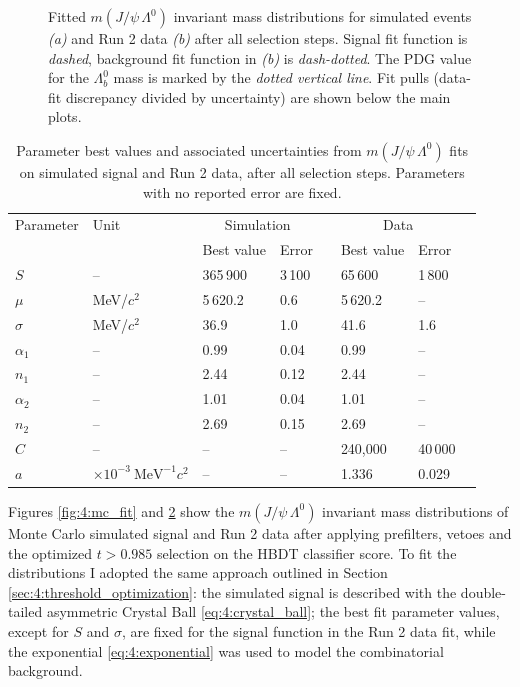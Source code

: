 \begin{figure}[t]
\begin{subfigure}{.45\textwidth}
		\caption{}
		\label{fig:4:data_fit}
	\end{subfigure}
	\caption{Fitted $m(J/\psi\,\Lambda^0)$ invariant mass distributions for simulated \demonstratorshort events \textit{(a)} and Run 2 data \textit{(b)} after all selection steps. Signal fit function is \textit{dashed}, background fit function in \textit{(b)} is \textit{dash-dotted}. The PDG value for the $\Lambda_b^0$ mass \cite{PDG} is marked by the \textit{dotted vertical line}. Fit pulls (data-fit discrepancy divided by uncertainty) are shown below the main plots.}
\end{figure}

\begin{table}
	\begin{center}
	\begin{tabular}{@{}llllllll@{}}
		\toprule
		Parameter
		& Unit
		& \multicolumn{2}{c}{Simulation}	& \phantom{a}
		& \multicolumn{2}{c}{Data} \\
		\cmidrule{3-4} \cmidrule{6-7}
		&& Best value	& Error				&& Best value	& Error \\
		\midrule
		$S$			& --		& 365\,900	& 3\,100&& 65\,600	& 1\,800	\\
		$\mu$		& MeV/$c^2$	& 5\,620.2 	& 0.6	&& 5\,620.2	& -- 		\\
		$\sigma$	& MeV/$c^2$	& 36.9		& 1.0	&& 41.6		& 1.6		\\
		$\alpha_1$	& --		& 0.99		& 0.04	&& 0.99	& --		\\
		$n_1$		& --		& 2.44		& 0.12	&& 2.44		& --		\\
		$\alpha_2$	& --		& 1.01		& 0.04	&& 1.01	& --		\\
		$n_2$		& --		& 2.69		& 0.15	&& 2.69		& --		\\
		$C$			& --		& --		& --	&& 240,000	& 40\,000	\\
		$a$			& $\times {10}^{-3}~\text{MeV}^{-1}c^2$
								& --		& --	&& 1.336	& 0.029		\\
		\bottomrule
	\end{tabular}
	\end{center}
	\caption{Parameter best values and associated uncertainties from $m(J/\psi\,\Lambda^0)$ fits on simulated signal and Run 2 data, after all selection steps. Parameters with no reported error are fixed.}
	\label{tab:4:fit_results}
\end{table}

Figures \ref{fig:4:mc_fit} and \ref{fig:4:data_fit} show the $m(J/\psi\,\Lambda^0)$ invariant mass distributions of Monte Carlo simulated signal and Run 2 data after applying prefilters, \physbkgshort vetoes and the optimized $t > 0.985$ selection on the HBDT classifier score.
To fit the distributions I adopted the same approach outlined in Section \ref{sec:4:threshold_optimization}:
the simulated signal is described with the double-tailed asymmetric Crystal Ball \eqref{eq:4:crystal_ball};
the best fit parameter values, except for $S$ and $\sigma$, are fixed for the signal function in the Run 2 data fit, while the exponential \eqref{eq:4:exponential} was used to model the combinatorial background.

